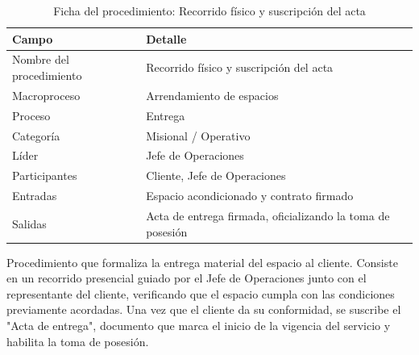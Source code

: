 \documentclass[11pt, a4paper, oneside]{report}
\begin{document}
\begin{table}[H]
\centering\small
\renewcommand{\arraystretch}{1.25}
\setlength{\tabcolsep}{6pt}
\begin{tabularx}{\textwidth}{|>{\raggedright\arraybackslash}p{}|>{\raggedright\arraybackslash}X|}
\hline
\rowcolor{upeu_mid}
\color{white}\bfseries Campo & \color{white}\bfseries Detalle \\ \hline
\rowcolor{gray!10}
Nombre del procedimiento & Recorrido físico y suscripción del acta \\ \hline
\rowcolor{gray!10}
Macroproceso & Arrendamiento de espacios \\ \hline
Proceso & Entrega \\ \hline
\rowcolor{gray!10}
Categoría & Misional / Operativo \\ \hline
Líder & Jefe de Operaciones \\ \hline
\rowcolor{gray!10}
Participantes & Cliente, Jefe de Operaciones \\ \hline
Entradas & Espacio acondicionado y contrato firmado \\ \hline
\rowcolor{gray!10}
Salidas & Acta de entrega firmada, oficializando la toma de posesión \\ \hline
\end{tabularx}
\caption{Ficha del procedimiento: Recorrido físico y suscripción del acta}
\end{table}

Procedimiento que formaliza la entrega material del espacio al cliente. Consiste en un recorrido presencial guiado por el Jefe de Operaciones junto con el representante del cliente, verificando que el espacio cumpla con las condiciones previamente acordadas. Una vez que el cliente da su conformidad, se suscribe el "Acta de entrega", documento que marca el inicio de la vigencia del servicio y habilita la toma de posesión.
\end{document}
